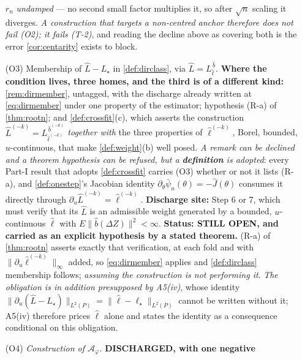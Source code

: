 \begin{remark}
\begin{enumerate}
$r_n$ \emph{undamped} --- no second small factor multiplies it, so after $\sqrt n$ scaling it diverges.
\emph{A construction that targets a non-centred anchor therefore does not fail \textup{(O2)}; it fails
\textup{(T-2)}}, and reading the decline above as covering both is the error \cref{cor:centarity}
exists to block.
\item[(O3)] Membership of $\hat L-L_\star$ in \cref{def:dirclass}, via $\hat L=L^{\,\hat b}_{\hat\ell}$.
\textbf{Where the condition lives, three homes, and the third is of a different kind:}
\cref{rem:dirmember}, untagged, with the discharge already
written at \eqref{eq:dirmember} under one property of the estimator; hypothesis (R-a) of
\cref{thm:rootn}; and \cref{def:crossfit}\textup{(c)}, which
asserts the construction $\hat L^{(-k)}=L^{\,\hat b^{(-k)}}_{\hat\ell^{(-k)}}$ \emph{together with} the three
properties of $\hat\ell^{(-k)}$, Borel, bounded, $u$-continuous, that make \cref{def:weight}(b) well
posed. \emph{A remark can be declined and a theorem hypothesis can be refused, but a \textbf{definition} is
adopted}: every Part-I result that adopts \cref{def:crossfit} carries (O3) whether or not it lists (R-a),
and \cref{def:onestep}'s Jacobian identity $\partial_\theta\bar\psi_n(\theta)=-\hat J(\theta)$ consumes it
directly through $\partial_u\hat L^{(-k)}=\hat\ell^{(-k)}$.
\textbf{Discharge site:} Step 6 or
7, which must verify that its $\hat L$ is an admissible weight generated by a bounded, $u$-continuous
$\hat\ell$ with $E\|\hat b(\Delta Z)\|^{2}<\infty$. \textbf{Status: STILL OPEN, and carried as
an explicit hypothesis by a stated theorem.} (R-a) of \cref{thm:rootn} asserts exactly that verification, at
each fold and with $\|\partial_u\hat\ell^{(-k)}\|_\infty$ added, so \eqref{eq:dirmember} applies and
\cref{def:dirclass} membership follows; \emph{assuming the construction is not performing it}.
\emph{The obligation is in addition presupposed by A5(iv)}, whose identity
$\|\partial_u(\hat L-L_\star)\|_{L^{2}(P)}=\|\hat\ell-\ell_\star\|_{L^{2}(P)}$ cannot be written without
it; A5(iv) therefore prices $\hat\ell$ alone and states the identity as a consequence conditional
on this obligation.
\item[(O4)] \emph{Construction of $\hat{\mathcal A}_\varphi$.} \textbf{DISCHARGED, with one negative
}
\end{enumerate}
\end{remark}
